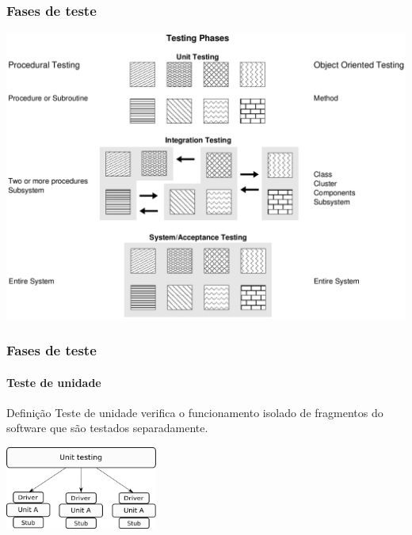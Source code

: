 \begin{frame}[c]
\frametitle{Fases de teste}

\begin{block:fact}{}
    \centering
    \includegraphics[scale=.3]{teste-de-software/conceitos-basicos/Imagens/fases-de-teste}
\end{block:fact}
\end{frame}


\begin{frame}
\frametitle{Fases de teste}
\framesubtitle{Teste de unidade}
\label{concept:teste-unitario}

\begin{block:concept}{Definição}
Teste de unidade verifica o funcionamento isolado de fragmentos do software que são testados separadamente.
\end{block:concept}

\begin{block:fact}{}
    \centering
    \includegraphics[width=5cm]{teste-de-software/conceitos-basicos/Imagens/teste-unitario}
\end{block:fact}

\hfill
{}
\end{frame}


